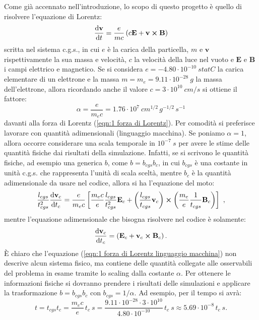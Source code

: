 \documentclass[10pt,a4paper]{article}
\begin{document}
Come già accennato nell'introduzione, lo scopo di questo progetto è quello di risolvere l'equazione di Lorentz:
\begin{equation}
    \dv{\mathbf{v}}{t} = \frac{e}{mc}\left(c\mathbf{E} + \mathbf{v}\cross\mathbf{B}\right)
    \label{eqn:1 forza di Lorentz}
\end{equation}
scritta nel sistema c.g.s., in cui $e$ è la carica della particella, $m$ e $\mathbf{v}$ rispettivamente la sua massa e velocità, $c$ la velocità della luce nel vuoto e $\mathbf{E}$ e $\mathbf{B}$ i campi elettrico e magnetico. Se si considera $e = -4.80\cdot 10^{-10}\ \unit{statC}$ la carica elementare di un elettrone e la massa $m = m_e = 9.11\cdot 10^{-28}\ \unit{g}$ la massa dell'elettrone, allora ricordando anche il valore $c = 3\cdot 10^{10}\ \unit{cm/s}$ si ottiene il fattore:
\begin{equation}
    \alpha = \frac{e}{m_e c} = 1.76\cdot 10^7\ \unit{cm^{1/2}\, g^{-1/2}\, s^{-1}}
\end{equation}
davanti alla forza di Lorentz (\ref{eqn:1 forza di Lorentz}). Per comodità si preferisce lavorare con quantità adimensionali (linguaggio macchina). Se poniamo $\alpha = 1$, allora occorre considerare una scala temporale in $10^{-7}\ \unit{s}$ per avere le stime delle quantità fisiche dai risultati della simulazione. Infatti, se si scrivono le quantità fisiche, ad esempio una generica $b$, come $b = b_{cgs} b_c$, in cui $b_{cgs}$ è una costante in unità c.g.s. che rappresenta l'unità di scala sceltà, mentre $b_c$ è la quantità adimensionale da usare nel codice, allora si ha l'equazione del moto:
\begin{equation}
    \frac{l_{cgs}}{t^2_{cgs}}\dv{\mathbf{v}_c}{t_c} = \frac{e}{m_e c}\left[ \frac{m_e c}{e} \frac{l_{cgs}}{t_{cgs}^2}\mathbf{E}_c + \left( \frac{l_{cgs}}{t_{cgs}}\mathbf{v}_c \right) \cross \left( \frac{m_e}{e} \frac{1}{t_{cgs}} \mathbf{B}_c \right) \right]\ ,
\end{equation}
mentre l'equazione adimensionale che bisogna risolvere nel codice è solamente:
\begin{equation}
    \dv{\mathbf{v}_c}{t_c} = \left( \mathbf{E}_c + \mathbf{v}_c\cross\mathbf{B}_c\right).
    \label{eqn:1 forza di Lorentz linguaggio macchina}
\end{equation}
È chiaro che l'equazione (\ref{eqn:1 forza di Lorentz linguaggio macchina}) non descrive alcun sistema fisico, ma contiene delle quantità collegate alle osservabili del problema in esame tramite lo scaling dalla costante $\alpha$. Per ottenere le informazioni fisiche si dovranno prendere i risultati delle simulazioni e applicare la trasformazione $b = b_{cgs} b_c$ con $b_{cgs} = 1/\alpha$. Ad esempio, per il tempo si avrà:
\begin{equation}
    t = t_{cgs} t_c = \frac{m_e c}{e}\, t_c\ \unit{s} = \frac{ 9.11\cdot 10^{-28} \cdot 3\cdot 10^{10} }{ 4.80 \cdot 10^{-10} }\, t_c\ \unit{s} \approx 5.69\cdot 10^{-8}\, t_c\ \unit{s}.
\end{equation}
\end{document}
